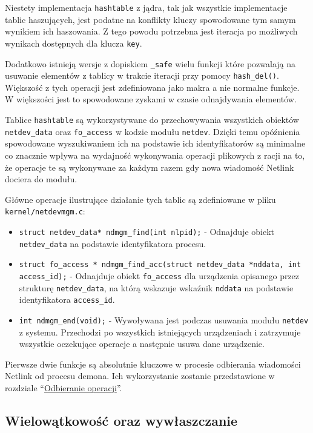 Niestety implementacja \texttt{hashtable} z jądra, tak jak wszystkie
implementacje tablic haszujących, jest podatne na konflikty kluczy
spowodowane tym samym wynikiem ich haszowania. Z tego powodu potrzebna
jest iteracja po możliwych wynikach dostępnych dla klucza \texttt{key}.

Dodatkowo istnieją wersje z dopiskiem \texttt{\_safe} wielu funkcji
które pozwalają na usuwanie elementów z tablicy w trakcie iteracji przy
pomocy \texttt{hash\_del()}. Większość z tych operacji jest zdefiniowana
jako makra a nie normalne funkcje. W większości jest to spowodowane
zyskami w czasie odnajdywania elementów.

Tablice \texttt{hashtable} są wykorzystywane do przechowywania
wszystkich obiektów \texttt{netdev\_data} oraz \texttt{fo\_access} w
kodzie modułu \texttt{netdev}. Dzięki temu opóźnienia spowodowane
wyszukiwaniem ich na podstawie ich identyfikatorów są minimalne co
znacznie wpływa na wydajność wykonywania operacji plikowych z racji na
to, że operacje te są wykonywane za każdym razem gdy nowa wiadomość
Netlink dociera do modułu.

Główne operacje ilustrujące działanie tych tablic są zdefiniowane w
pliku \texttt{kernel/netdevmgm.c}:

\begin{itemize}
\itemsep1pt\parskip0pt
\item
  \texttt{struct netdev\_data* ndmgm\_find(int nlpid);} - Odnajduje
  obiekt \texttt{netdev\_data} na podstawie identyfikatora procesu.
\item
  \texttt{struct fo\_access * ndmgm\_find\_acc(struct netdev\_data *nddata, int access\_id);}
  - Odnajduje obiekt \texttt{fo\_access} dla urządzenia opisanego przez
  strukturę \texttt{netdev\_data}, na którą wskazuje wskaźnik
  \texttt{nddata} na podstawie identyfikatora \texttt{access\_id}.
\item
  \texttt{int ndmgm\_end(void);} - Wywoływana jest podczas usuwania
  modułu \texttt{netdev} z systemu. Przechodzi po wszystkich
  istniejących urządzeniach i zatrzymuje wszystkie oczekujące operacje a
  następnie usuwa dane urządzenie.
\end{itemize}

Pierwsze dwie funkcje są absolutnie kluczowe w procesie odbierania
wiadomości Netlink od procesu demona. Ich wykorzystanie zostanie
przedstawione w rozdziale ``\hyperref[odbieranie-operacji]{Odbieranie
operacji}''.

\subsection{Wielowątkowość oraz wywłaszczanie}

